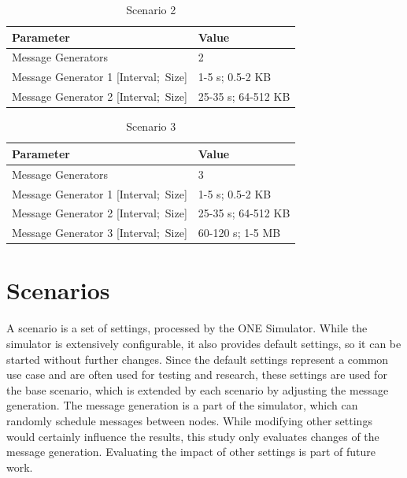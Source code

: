 \documentclass[conference,10pt,letterpaper,final]{IEEEtran}
\begin{document}
\begin{table}[!ht]
	
    \begin{tabular}{ | p{} | p{} | }    
    \hline
    Parameter & Value \\ \hline \hline 
    \hline
    Message Generators & 2 \\ \hline
    Message Generator 1 [Interval;~Size] & 1-5 s; 0.5-2 KB \\ \hline 
    Message Generator 2 [Interval;~Size] & 25-35 s; 64-512 KB \\ \hline 
    \hline
    \end{tabular}

    
    \vspace{0.2cm}
    \caption{Scenario 2}
    \label{table:scenario2}
\end{table}

\begin{table}[!ht]
    \begin{tabular}{ | p{} | p{} | }    
    \hline
    Parameter & Value \\ \hline \hline 
    \hline
    Message Generators & 3 \\ \hline
    Message Generator 1 [Interval;~Size] & 1-5 s; 0.5-2 KB \\ \hline 
    Message Generator 2 [Interval;~Size] & 25-35 s; 64-512 KB \\ \hline 
    Message Generator 3 [Interval;~Size] & 60-120 s; 1-5 MB \\ \hline 
    \hline
    \end{tabular}

    
    \vspace{0.2cm}
    \caption{Scenario 3}
    \label{table:scenario3}
\end{table}



\section{Scenarios}
\label{sec:scenarios}

A scenario is a set of settings, processed by the ONE Simulator.
While the simulator is extensively configurable, it also provides default settings, so it can be started without further changes.
Since the default settings represent a common use case and are often used for testing and research, these settings are used for the base scenario, which is extended by each scenario by adjusting the message generation.
The message generation is a part of the simulator, which can randomly schedule messages between nodes.
While modifying other settings would certainly influence the results, this study only evaluates changes of the message generation.
Evaluating the impact of other settings is part of future work.
\end{document}
